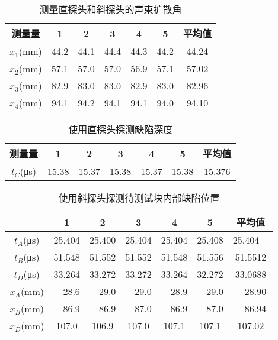 \documentclass[a4paper,utf8]{article}
\begin{document}
\begin{table}[!ht]
    \caption{测量直探头和斜探头的声束扩散角}\label{tab:exp6}
    \begin{tabularx}{\textwidth}{*{7}{C}} \toprule
        测量量 & 1 & 2 & 3 & 4 & 5 & 平均值 \\ \midrule
        $x_1$(\unit{\mm}) & 44.2 & 44.1 & 44.4 & 44.3 & 44.2 & 44.24 \\ 
        $x_2$(\unit{\mm}) & 57.1 & 57.0 & 57.0 & 56.9 & 57.1 & 57.02 \\ 
        $x_3$(\unit{\mm}) & 82.9 & 83.0 & 83.0 & 82.9 & 83.0 & 82.96 \\ 
        $x_4$(\unit{\mm}) & 94.1 & 94.2 & 94.1 & 94.1 & 94.0 & 94.10 \\ \bottomrule
    \end{tabularx}
\end{table}

\begin{table}[!ht]
    \caption{使用直探头探测缺陷深度}\label{tab:exp7}
    \begin{tabularx}{\textwidth}{*{7}{C}} \toprule
        测量量 & 1 & 2 & 3 & 4 & 5 & 平均值 \\ \midrule
        $t_C$(\unit{\us}) & 15.38 & 15.37 & 15.38 & 15.37 & 15.38 & 15.376 \\ \bottomrule
    \end{tabularx}
\end{table}

\begin{table}[!ht]
    \caption{使用斜探头探测待测试块内部缺陷位置}\label{tab:exp8}
    \begin{tabularx}{\textwidth}{*{7}{C}} \toprule
        ~ & 1 & 2 & 3 & 4 & 5 & 平均值 \\ \midrule
        $t_A$(\unit{\us}) & 25.404 & 25.400 & 25.404 & 25.404 & 25.408 & 25.404~~{} \\
        $t_B$(\unit{\us}) & 51.548 & 51.552 & 51.552 & 51.548 & 51.556 & 51.5512 \\
        $t_D$(\unit{\us}) & 33.264 & 33.272 & 33.272 & 33.264 & 32.272 & 33.0688 \\[2mm]
        $x_A$(\unit{\mm}) & ~~28.6 & ~~29.0 & ~~29.0 & ~~28.9 & ~~29.0 & ~~28.90 \\
        $x_B$(\unit{\mm}) & ~~86.9 & ~~86.9 & ~~87.0 & ~~86.9 & ~~87.0 & ~~86.94 \\
        $x_D$(\unit{\mm}) & 107.0 & 106.9 & 107.0 & 107.1 & 107.1 & 107.02 \\
        \bottomrule
    \end{tabularx}
\end{table}

\end{document}
